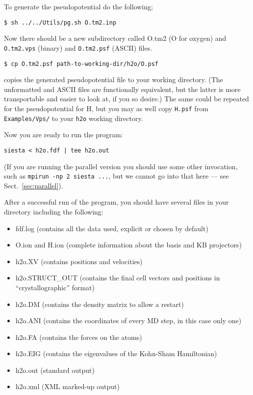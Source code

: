\documentclass[11pt]{article}
\begin{document}
To generate the pseudopotential do the following;

{\tt \$ sh ../../Utils/pg.sh O.tm2.inp}

\noindent
Now there should be a new subdirectory called O.tm2 (O for oxygen)
and {\tt O.tm2.vps} (binary) and {\tt O.tm2.psf} (ASCII) files.

{\tt \$ cp O.tm2.psf path-to-working-dir/h2o/O.psf}

\noindent
copies the generated pseudopotential file to your working directory. 
(The unformatted and ASCII files are functionally equivalent, but
the latter is more transportable and easier to look at, if you so
desire.) The same could be repeated for the pseudopotential for H,
but you may as well copy {\tt H.psf} from {\tt Examples/Vps/}
to your {\tt h2o} working directory.

\noindent
Now you are ready to run the program:

{\tt siesta < h2o.fdf | tee h2o.out}

\noindent
(If you are running the parallel version you should use some other 
invocation, such as {\tt mpirun -np 2 siesta ...}, but we cannot 
go into that here --- see Sect.~\ref{sec:parallel}).

After a successful run of the program, you should have several
files in your directory including the following:
\begin{itemize}

\item fdf.log
 (contains all the data used, explicit or chosen by default) 
\item O.ion and H.ion
 (complete information about the basis and KB projectors)
\item h2o.XV
 (contains positions and velocities)
\item h2o.STRUCT\_OUT
 (contains the final cell vectors and positions in
 ``crystallographic'' format)
\item h2o.DM
 (contains the density matrix to allow a restart)
\item h2o.ANI
 (contains the coordinates of every MD step, in this case only one)
\item h2o.FA
 (contains the forces on the atoms)
\item h2o.EIG
 (contains the eigenvalues of the Kohn-Sham Hamiltonian)
\item h2o.out
 (standard output)
\item h2o.xml
 (XML marked-up output)
\end{itemize}
\end{document}
